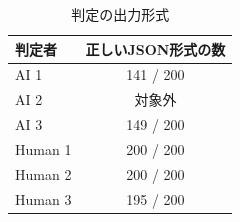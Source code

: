 \begin{table}[h]
\begin{center}
\caption{判定の出力形式} \label{tab:hanteiform}
\begin{tabular}{lc}
判定者 & 正しいJSON形式の数 \\
\hline
AI 1 & 141 / 200 \\
AI 2 & 対象外 \\
AI 3 & 149 / 200 \\
Human 1 & 200 / 200 \\
Human 2 & 200 / 200  \\
Human 3 & 195 / 200  \\
\end{tabular}
\end{center}
\end{table}
